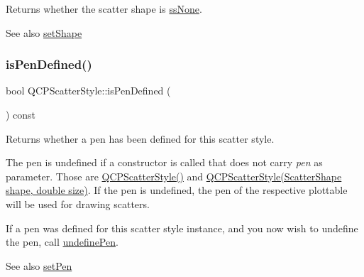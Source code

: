 Returns whether the scatter shape is \hyperlink{class_q_c_p_scatter_style_adb31525af6b680e6f1b7472e43859349a4a706d6879ec5c34643446db00469b33}{ss\+None}.

\begin{DoxySeeAlso}{See also}
\hyperlink{class_q_c_p_scatter_style_a7c641c4d4c6d29cb705d3887cfce91c1}{set\+Shape} 
\end{DoxySeeAlso}
\mbox{\label{class_q_c_p_scatter_style_a47077eb6450fe9a788f833e4ec1b1d5a}} 
\subsubsection{\texorpdfstring{is\+Pen\+Defined()}{isPenDefined()}}
{\footnotesize\ttfamily bool Q\+C\+P\+Scatter\+Style\+::is\+Pen\+Defined (\begin{DoxyParamCaption}{ }\end{DoxyParamCaption}) const\hspace{0.3cm}{\ttfamily [inline]}}

Returns whether a pen has been defined for this scatter style.

The pen is undefined if a constructor is called that does not carry {\itshape pen} as parameter. Those are \hyperlink{class_q_c_p_scatter_style_a8836018d9ad83ccd8870de8315c1be73}{Q\+C\+P\+Scatter\+Style()} and \hyperlink{class_q_c_p_scatter_style_a003d92f74f4561eda111862eadd62f28}{Q\+C\+P\+Scatter\+Style(\+Scatter\+Shape shape, double size)}. If the pen is undefined, the pen of the respective plottable will be used for drawing scatters.

If a pen was defined for this scatter style instance, and you now wish to undefine the pen, call \hyperlink{class_q_c_p_scatter_style_acabc2a8c83d650b946f50c3166b6c35e}{undefine\+Pen}.

\begin{DoxySeeAlso}{See also}
\hyperlink{class_q_c_p_scatter_style_a761f1f229cc0ca4703e1e2b89f6dd1ba}{set\+Pen} 
\end{DoxySeeAlso}
\mbox{\label{class_q_c_p_scatter_style_a74d692aaeb8d4b36d6f7d510e44264b1}} 
